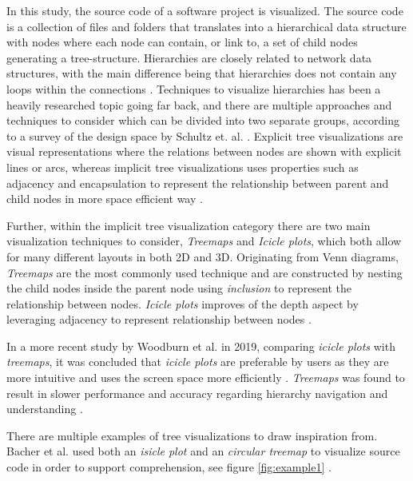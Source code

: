 In this study, the source code of a software project is visualized.
The source code is a collection of files and folders that translates into a hierarchical data structure with nodes where each node can contain, or link to, a set of child nodes generating a tree-structure.
Hierarchies are closely related to network data structures, with the main difference being that hierarchies does not contain any loops within the connections \cite{spence_information_2014}.
Techniques to visualize hierarchies has been a heavily researched topic going far back, and there are multiple approaches and techniques to consider which can be divided into two separate groups, according to a survey of the design space by Schultz et. al. \cite{schulz_design_2011}.
Explicit tree visualizations are visual representations where the relations between nodes are shown with explicit lines or arcs, whereas implicit tree visualizations uses properties such as adjacency and encapsulation to represent the relationship between parent and child nodes in more space efficient way \cite{schulz_design_2011}.

Further, within the implicit tree visualization category there are two main visualization techniques to consider, \textit{Treemaps} and \textit{Icicle plots}, which both allow for many different layouts in both 2D and 3D.
Originating from Venn diagrams, \textit{Treemaps} are the most commonly used technique and are constructed by nesting the child nodes inside the parent node using \textit{inclusion} to represent the relationship between nodes.
\textit{Icicle plots} improves of the depth aspect by leveraging adjacency to represent relationship between nodes \cite{schulz_design_2011}.

In a more recent study by Woodburn et al. in 2019, comparing \textit{icicle plots} with \textit{treemaps}, it was concluded that \textit{icicle plots} are preferable by users as they are more intuitive and uses the screen space more efficiently \cite{woodburn_interactive_2019}.
\textit{Treemaps} was found to result in slower performance and accuracy regarding hierarchy navigation and understanding \cite{woodburn_interactive_2019}.

There are multiple examples of tree visualizations to draw inspiration from.
Bacher et al. used both an \textit{isicle plot} and an \textit{circular treemap} to visualize source code in order to support comprehension, see figure \ref{fig:example1} \cite{bacher_using_2016}.

